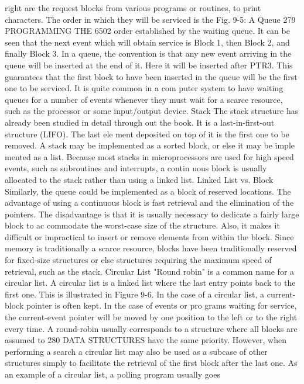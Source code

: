 \documentclass{book}
\begin{document}
{right are the request blocks from various programs or routines, to
print characters. The order in which they will be serviced is the
Fig. 9-5: A Queue
279
PROGRAMMING THE 6502
order established by the waiting queue. It can be seen that the
next event which will obtain service is Block 1, then Block 2, and finally
Block 3. In a queue, the convention is that any new event arriving in the
queue will be inserted at the end of it. Here it will be inserted after
PTR3. This guarantees that the first block to have been inserted in the
queue will be the first one to be serviced. It is quite common in a com
puter system to have waiting queues for a number of events whenever
they must wait for a scarce resource, such as the processor or some
input/output device.
Stack
The stack structure has already been studied in detail through
out the book. It is a last-in-first-out structure (LIFO). The last ele
ment deposited on top of it is the first one to be removed. A stack
may be implemented as a sorted block, or else it may be imple
mented as a list. Because most stacks in microprocessors are used
for high speed events, such as subroutines and interrupts, a contin
uous block is usually allocated to the stack rather than using a
linked list.
Linked List vs. Block
Similarly, the queue could be implemented as a block of reserved
locations. The advantage of using a continuous block is fast
retrieval and the elimination of the pointers. The disadvantage is
that it is usually necessary to dedicate a fairly large block to ac
commodate the worst-case size of the structure. Also, it makes it
difficult or impractical to insert or remove elements from within
the block. Since memory is traditionally a scarce resource, blocks
have been traditionally reserved for fixed-size structures or else
structures requiring the maximum speed of retrieval, such as the
stack.
Circular List
"Round robin" is a common name for a circular list. A circular
list is a linked list where the last entry points back to the first one.
This is illustrated in Figure 9-6. In the case of a circular list, a
current-block pointer is often kept. In the case of events or pro
grams waiting for service, the current-event pointer will be moved
by one position to the left or to the right every time. A round-robin
usually corresponds to a structure where all blocks are assumed to
280
DATA STRUCTURES
have the same priority. However, when performing a search a circular
list may also be used as a subcase of other structures simply to facilitate
the retrieval of the first block after the last one.
As an example of a circular list, a polling program usually goes
}
\end{document}
